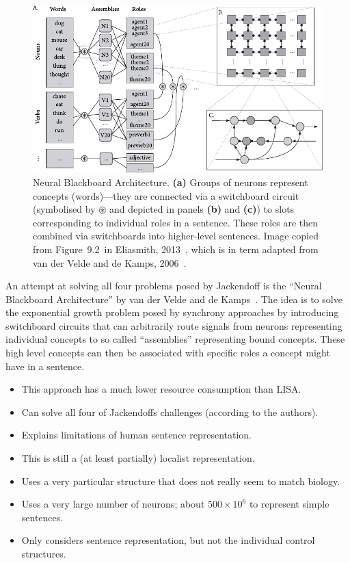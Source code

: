 \documentclass[10pt,letterpaper,oneside]{article}
\begin{document}
\begin{figure}[t]
	\centering
	\includegraphics[width=\textwidth]{media/eliasmith_2013_blackboard.pdf}
	\caption{Neural Blackboard Architecture. \textbf{(a)} Groups of neurons represent concepts (words)---they are connected via a switchboard circuit (symbolised by $\circledast$ and depicted in panels \textbf{(b)} and \textbf{(c)}) to slots corresponding to individual roles in a sentence. These roles are then combined via switchboards into higher-level sentences. Image copied from Figure~9.2~in Eliasmith, 2013~\cite{eliasmith2013how}, which is in term adapted from van der Velde and de Kamps, 2006~\cite{vandervelde2006neural}.}
\end{figure}

An attempt at solving all four problems posed by Jackendoff is the \enquote{Neural Blackboard Architecture} by van der Velde and de Kamps~\cite{vandervelde2006neural}. The idea is to solve the exponential growth problem posed by synchrony approaches by introducing switchboard circuits that can arbitrarily route signals from neurons representing individual concepts to so called \enquote{assemblies} representing bound concepts. These high level concepts can then be associated with specific roles a concept might have in a sentence.
\begin{itemize}
	\item[\OPlus] This approach has a much lower resource consumption than LISA.
	\item[\OPlus] Can solve all four of Jackendoffs challenges (according to the authors).
	\item[\OPlus] Explains limitations of human sentence representation.
	\item[\OMeh] This is still a (at least partially) localist representation.
	\item[\OMinus] Uses a very particular structure that does not really seem to match biology.
	\item[\OMinus] Uses a very large number of neurons; about $500\times 10^6$ to represent simple sentences.
	\item[\OMinus] Only considers sentence representation, but not the individual control structures.
\end{itemize}
\end{document}
